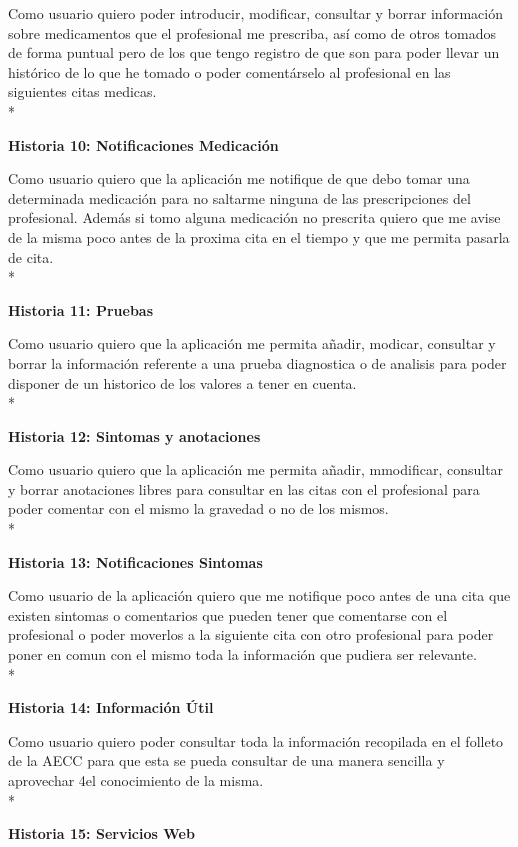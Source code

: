 \documentclass[../pfc.tex]{subfiles}
\begin{document}
		Como usuario quiero poder introducir, modificar, consultar y borrar información sobre medicamentos que el profesional me prescriba, así como de otros tomados de forma puntual pero de los que tengo registro de que son para poder llevar un histórico de lo que he tomado o poder comentárselo al profesional en las siguientes citas medicas.\\*
	
	
	\textbf{Historia 10: Notificaciones Medicación}
	
		Como usuario quiero que la aplicación me notifique de que debo tomar una determinada medicación para no saltarme ninguna de las prescripciones del profesional. Además si tomo alguna medicación no prescrita quiero que me avise de la misma poco antes de la proxima cita en el tiempo y que me permita pasarla de cita.\\*
	
	
	\textbf{Historia 11: Pruebas}
	
		Como usuario quiero que la aplicación me permita añadir, modicar, consultar y borrar la información referente a una prueba diagnostica o de analisis para poder disponer de un historico de los valores a tener en cuenta. \\*
	
	
	\textbf{Historia 12: Sintomas y anotaciones}
	
		Como usuario quiero que la aplicación me permita añadir, mmodificar, consultar y borrar anotaciones libres para consultar en las citas con el profesional para poder comentar con el mismo la gravedad o no de los mismos.\\*
	

	\textbf{Historia 13: Notificaciones Sintomas}
	
		Como usuario de la aplicación quiero que me notifique poco antes de una cita que existen sintomas o comentarios que pueden tener que comentarse con el profesional o poder moverlos a la siguiente cita con otro profesional para poder poner en comun con el mismo toda la información que pudiera ser relevante.\\*
	
	
	\textbf{Historia 14: Información Útil}
	
		Como usuario quiero poder consultar toda la información recopilada en el folleto de la AECC para que esta se pueda consultar de una manera sencilla y aprovechar 4el conocimiento de la misma.\\*
	
	
	\textbf{Historia 15: Servicios Web}
	
\end{document}
